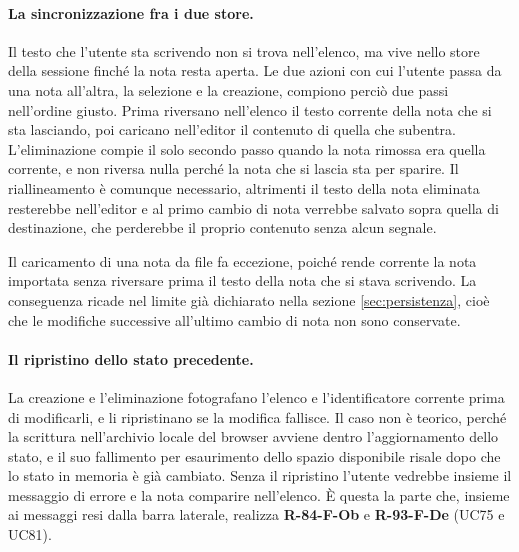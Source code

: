 \documentclass[a4paper, 10pt]{article}
\begin{document}
\paragraph{La sincronizzazione fra i due store.}
Il testo che l'utente sta scrivendo non si trova nell'elenco, ma vive nello store della sessione finché la nota resta aperta. Le due azioni con cui l'utente passa da una nota all'altra, la selezione e la creazione, compiono perciò due passi nell'ordine giusto. Prima riversano nell'elenco il testo corrente della nota che si sta lasciando, poi caricano nell'editor il contenuto di quella che subentra. L'eliminazione compie il solo secondo passo quando la nota rimossa era quella corrente, e non riversa nulla perché la nota che si lascia sta per sparire. Il riallineamento è comunque necessario, altrimenti il testo della nota eliminata resterebbe nell'editor e al primo cambio di nota verrebbe salvato sopra quella di destinazione, che perderebbe il proprio contenuto senza alcun segnale.

Il caricamento di una nota da file fa eccezione, poiché rende corrente la nota importata senza riversare prima il testo della nota che si stava scrivendo. La conseguenza ricade nel limite già dichiarato nella sezione \ref{sec:persistenza}, cioè che le modifiche successive all'ultimo cambio di nota non sono conservate.

\paragraph{Il ripristino dello stato precedente.}
La creazione e l'eliminazione fotografano l'elenco e l'identificatore corrente prima di modificarli, e li ripristinano se la modifica fallisce. Il caso non è teorico, perché la scrittura nell'archivio locale del browser avviene dentro l'aggiornamento dello stato, e il suo fallimento per esaurimento dello spazio disponibile risale dopo che lo stato in memoria è già cambiato. Senza il ripristino l'utente vedrebbe insieme il messaggio di errore e la nota comparire nell'elenco. È questa la parte che, insieme ai messaggi resi dalla barra laterale, realizza \textbf{R-84-F-Ob} e \textbf{R-93-F-De} (UC75 e UC81).
\end{document}
